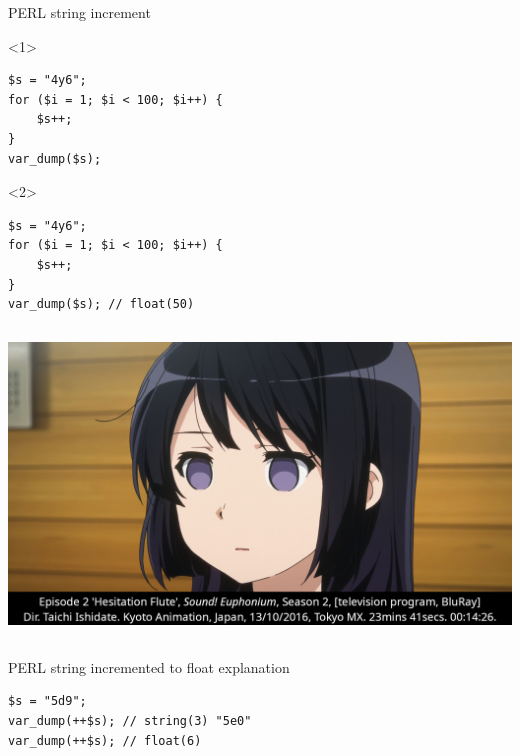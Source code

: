 \documentclass[aspectratio=169]{beamer}
\begin{document}
\begin{frame}[fragile]{PERL string increment}
    \begin{onlyenv}<1>
        \begin{verbatim}
$s = "4y6";
for ($i = 1; $i < 100; $i++) {
    $s++;
}
var_dump($s);
        \end{verbatim}
    \end{onlyenv}
    \begin{onlyenv}<2>
        \begin{verbatim}
$s = "4y6";
for ($i = 1; $i < 100; $i++) {
    $s++;
}
var_dump($s); // float(50)
        \end{verbatim}
    \end{onlyenv}
\end{frame}

\begin{frame}[plain]
  \begin{columns}[c]
    \column{\paperwidth}
    \includegraphics[width=\paperwidth, height=\paperheight]{images/00:14:26 Reina FishEyes Saison 2 Episode 2.jpg}
  \end{columns}
\end{frame}
\begin{frame}[fragile]{PERL string incremented to float explanation}
    \begin{verbatim}
$s = "5d9";
var_dump(++$s); // string(3) "5e0"
var_dump(++$s); // float(6)
    \end{verbatim}
\end{frame}
\end{document}

